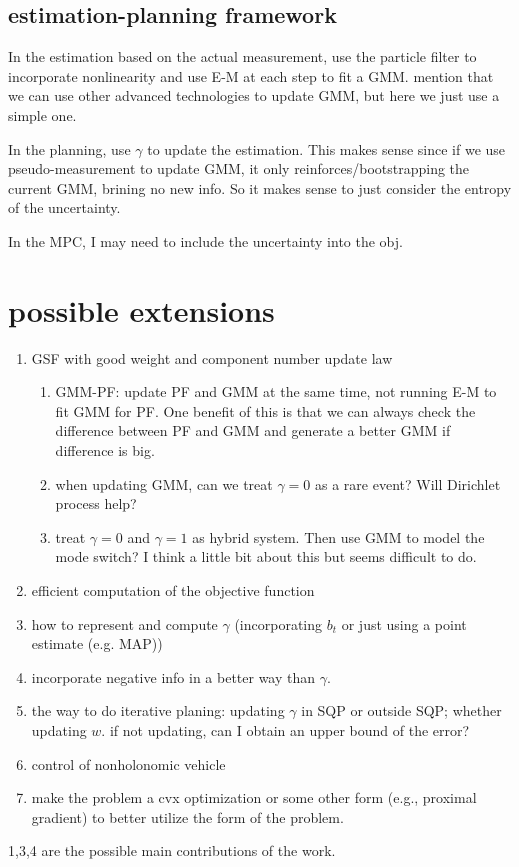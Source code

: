 \documentclass[letterpaper, 10 pt, conference]{ieeeconf}  %
\begin{document}
\subsection{estimation-planning framework}
In the estimation based on the actual measurement, use the particle filter to incorporate nonlinearity and use E-M at each step to fit a GMM. mention that we can use other advanced technologies to update GMM, but here we just use a simple one.

In the planning, use $\gamma$ to update the estimation. This makes sense since if we use pseudo-measurement to update GMM, it only reinforces/bootstrapping the current GMM, brining no new info. So it makes sense to just consider the entropy of the uncertainty.

In the MPC, I may need to include the uncertainty into the obj. 

\section{possible extensions}
\begin{enumerate}
	\item GSF with good weight and component number update law
		\begin{enumerate}
			\item GMM-PF: update PF and GMM at the same time, not running E-M to fit GMM for PF. One benefit of this is that we can always check the difference between PF and GMM and generate a better GMM if difference is big.
			\item when updating GMM, can we treat $\gamma=0$ as a rare event? Will Dirichlet process help?
			\item treat $\gamma=0$ and $\gamma=1$ as hybrid system. Then use GMM to model the mode switch? I think a little bit about this but seems difficult to do.
		\end{enumerate}
	\item efficient computation of the objective function
	\item how to represent and compute $\gamma$ (incorporating $b_t$ or just using a point estimate (e.g. MAP))
	\item incorporate negative info in a better way than $\gamma$.
	\item the way to do iterative planing: updating $\gamma$ in SQP or outside SQP; whether updating $w$. if not updating, can I obtain an upper bound of the error?
	\item control of nonholonomic vehicle
	\item make the problem a cvx optimization or some other form (e.g., proximal gradient) to better utilize the form of the problem.
\end{enumerate}
1,3,4 are the possible main contributions of the work.
\end{document}
